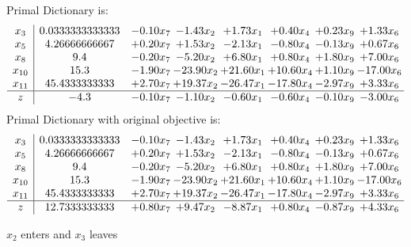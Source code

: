 \documentclass[8pt]{article}
\begin{document}
Primal Dictionary is:
\[\begin{array}{c| c c@{\hskip 2pt} c@{\hskip 2pt} c@{\hskip 2pt} c@{\hskip 2pt} c@{\hskip 2pt} c@{\hskip 2pt} }
 x_{3}   &  0.0333333333333 & -0.10 x_{7} & -1.43 x_{2} & +  1.73 x_{1} & +  0.40 x_{4} & +  0.23 x_{9} & +  1.33 x_{6}\\
 x_{5}   &  4.26666666667 & +  0.20 x_{7} & +  1.53 x_{2} & -2.13 x_{1} & -0.80 x_{4} & -0.13 x_{9} & +  0.67 x_{6}\\
 x_{8}   &  9.4 & -0.20 x_{7} & -5.20 x_{2} & +  6.80 x_{1} & +  0.80 x_{4} & +  1.80 x_{9} & +  7.00 x_{6}\\
 x_{10}   &  15.3 & -1.90 x_{7} & -23.90 x_{2} & + 21.60 x_{1} & + 10.60 x_{4} & +  1.10 x_{9} & -17.00 x_{6}\\
 x_{11}   &  45.4333333333 & +  2.70 x_{7} & + 19.37 x_{2} & -26.47 x_{1} & -17.80 x_{4} & -2.97 x_{9} & +  3.33 x_{6}\\
\hline
z    &  -4.3 & -0.10 x_{7} & -1.10 x_{2} & -0.60 x_{1} & -0.60 x_{4} & -0.10 x_{9} & -3.00 x_{6}\\
\end{array}\]
Primal Dictionary with original objective is:
\[\begin{array}{c| c c@{\hskip 2pt} c@{\hskip 2pt} c@{\hskip 2pt} c@{\hskip 2pt} c@{\hskip 2pt} c@{\hskip 2pt} }
 x_{3}   &  0.0333333333333 & -0.10 x_{7} & -1.43 x_{2} & +  1.73 x_{1} & +  0.40 x_{4} & +  0.23 x_{9} & +  1.33 x_{6}\\
 x_{5}   &  4.26666666667 & +  0.20 x_{7} & +  1.53 x_{2} & -2.13 x_{1} & -0.80 x_{4} & -0.13 x_{9} & +  0.67 x_{6}\\
 x_{8}   &  9.4 & -0.20 x_{7} & -5.20 x_{2} & +  6.80 x_{1} & +  0.80 x_{4} & +  1.80 x_{9} & +  7.00 x_{6}\\
 x_{10}   &  15.3 & -1.90 x_{7} & -23.90 x_{2} & + 21.60 x_{1} & + 10.60 x_{4} & +  1.10 x_{9} & -17.00 x_{6}\\
 x_{11}   &  45.4333333333 & +  2.70 x_{7} & + 19.37 x_{2} & -26.47 x_{1} & -17.80 x_{4} & -2.97 x_{9} & +  3.33 x_{6}\\
\hline
z    &  12.7333333333 & +  0.80 x_{7} & +  9.47 x_{2} & -8.87 x_{1} & +  0.80 x_{4} & -0.87 x_{9} & +  4.33 x_{6}\\
\end{array}\]


 $ x_{2} $ enters and $ x_{3} $ leaves 
\end{document}
